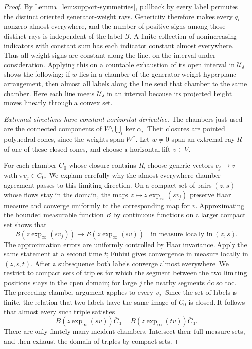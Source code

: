 \begin{proof}
By Lemma~\ref{lem:support-symmetries}, pullback by every label
permutes the distinct oriented generator-weight rays.  Genericity
therefore makes every $q_i$ nonzero almost everywhere, and the
number of positive signs among those distinct rays is independent
of the label $B$.  A finite collection of nonincreasing indicators
with constant sum has each indicator constant almost everywhere.
Thus all weight signs are constant along the line, on the interval
under consideration.  Applying this on a countable exhaustion of
its open interval in $\mathcal U_\delta$ shows the following:
if $w$ lies in a chamber of the generator-weight hyperplane
arrangement, then almost all labels along the line send that
chamber to the same chamber.  Here each line meets
$\mathcal U_\delta$ in an interval because its projected height
moves linearly through a convex set.

\emph{Extremal directions have constant horizontal derivative.}
The chambers just used are the connected components of
$W\setminus\bigcup_i\ker\alpha_i$.  Their closures are pointed
polyhedral cones, since the weights span $W^*$.  Let $w\ne0$ span
an extremal ray $R$ of one of these closed cones, and choose a
horizontal lift $v\in V$.

For each chamber $C_0$ whose closure contains $R$, choose generic
vectors $v_j\to v$ with $\pi v_j\in C_0$.  We explain carefully
why the almost-everywhere chamber agreement passes to this limiting
direction.  On a compact set of pairs $(z,s)$ whose flows stay in
the domain, the maps $z\mapsto z\exp_\infty(sv_j)$ preserve Haar
measure and converge uniformly to the corresponding map for $v$.
Approximating the bounded measurable function $B$ by continuous
functions on a larger compact set shows that
\[
 B(z\exp_\infty(sv_j))
       \longrightarrow B(z\exp_\infty(sv))
 \quad\text{in measure locally in }(z,s).
\]
The approximation errors are uniformly controlled by Haar
invariance.  Apply the same statement at a second time $t$;
Fubini gives convergence in measure locally in $(z,s,t)$.
After a subsequence both labels converge almost everywhere.
We restrict to compact sets of triples for which the segment
between the two limiting positions stays in the open domain;
for large $j$ the nearby segments do so too.  The preceding
chamber argument applies to every $v_j$.  Since the set of labels
is finite, the relation that two labels have the same image of
$C_0$ is closed.  It follows that almost every such triple satisfies
\[
 B(z\exp_\infty(sv))\overline C_0
   =B(z\exp_\infty(tv))\overline C_0.
\]
There are only finitely many incident chambers.  Intersect their
full-measure sets, and then exhaust the domain of triples by
compact sets.


\end{proof}
